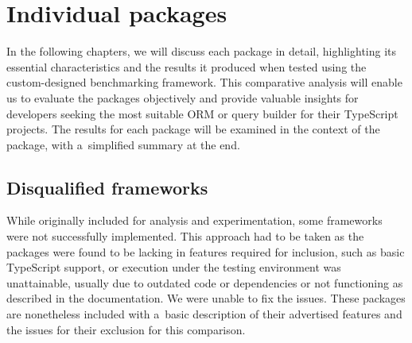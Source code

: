\chapter{Individual packages}

In the following chapters, we will discuss each package in detail, highlighting
its essential characteristics and the results it produced when tested using the
custom-designed benchmarking framework. This comparative analysis will enable us
to evaluate the packages objectively and provide valuable insights for
developers seeking the most suitable ORM or query builder for their TypeScript
projects. The results for each package will be examined in the context of the
package, with a~simplified summary at the end.











\section{Disqualified frameworks}

While originally included for analysis and experimentation, some frameworks were
not successfully implemented. This approach had to be taken as the packages were
found to be lacking in features required for inclusion, such as basic TypeScript
support, or execution under the testing environment was unattainable, usually
due to outdated code or dependencies or not functioning as described in the
documentation. We were unable to fix the issues. These packages are nonetheless
included with a~basic description of their advertised features and the issues
for their exclusion for this comparison.



